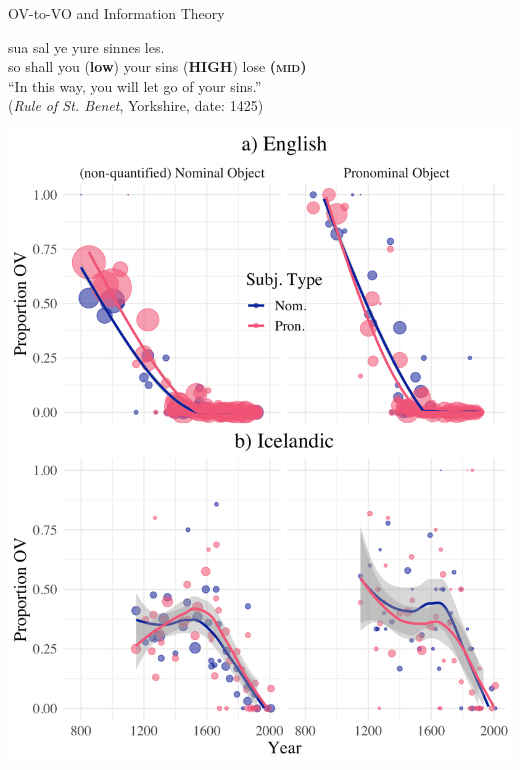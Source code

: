 \documentclass[hyperref={pdfpagelabels=false}]{beamer}
\begin{document}
\begin{frame}{OV-to-VO and Information Theory} 


\begin{exe}	
	\ex \gll sua sal ye yure sinnes les.\\
so shall {you (\textbf{\small{low}})} your {sins (\textbf{HIGH})} {lose \textbf{(\textsc{mid})}}\\
\quad ``In this way, you will let go of your sins.''\\
(\textsl{Rule of St. Benet}, Yorkshire, date: 1425)\\\vspace{5mm}


\end{exe}
\end{frame}


\begin{frame}
	
	\begin{center}
	\includegraphics[scale = 0.5]{Fig3-4.png}
	\end{center}
\end{frame}
\end{document}
